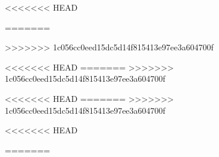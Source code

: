 \usepackage{bm}

<<<<<<< HEAD
\usepackage{graphicx}
\usepackage{amsmath,amssymb,amsthm}
\usepackage{bm}

\usepackage{xcolor}
\usepackage{colortbl}

=======
\usepackage{xcolor}
\usepackage{colortbl}
>>>>>>> 1c056cc0eed15dc5d14f815413e97ee3a604700f
\def\boldred#1{\color{red}\textbf{#1}}

\def\IC{\mathbb{C}}
\def\IF{\mathbb{F}}
\def\II{\mathbb{I}}
\def\IM{\mathbb{M}}
\def\IN{\mathbb{N}}
\def\IP{\mathbb{P}}
\def\IR{\mathbb{R}}
\def\IZ{\mathbb{Z}}

\def\ba{\mathbf{a}}
\def\bb{\mathbf{b}}
\def\bc{\mathbf{c}}
\def\be{\mathbf{e}}
<<<<<<< HEAD
=======
\def\bg{\mathbf{g}}
>>>>>>> 1c056cc0eed15dc5d14f815413e97ee3a604700f
\def\bh{\mathbf{h}}
\def\bi{\mathbf{i}}
\def\bj{\mathbf{j}}
\def\bk{\mathbf{k}}
\def\bn{\mathbf{n}}
\def\bp{\mathbf{p}}
\def\br{\mathbf{r}}
\def\bs{\mathbf{s}}
\def\bu{\mathbf{u}}
\def\bv{\mathbf{v}}
\def\bw{\mathbf{w}}
\def\bx{\mathbf{x}}
\def\by{\mathbf{y}}
\def\bz{\mathbf{z}}

\def\bB{\mathbf{B}}
\def\bD{\mathbf{D}}
\def\bF{\mathbf{F}}
\def\bG{\mathbf{G}}
\def\bN{\mathbf{N}}
\def\bR{\mathbf{R}}
\def\bS{\mathbf{S}}
\def\bT{\mathbf{T}}
\def\b0{\mathbf{0}}

\bmdefine{\bmu}{\bm{\mu}}

\def\A{\mathcal{A}}
\def\B{\mathcal{B}}
\def\C{\mathcal{C}}
\def\D{\mathcal{D}}
\def\E{\mathcal{E}}
\def\F{\mathcal{F}}
\def\G{\mathcal{G}}
\def\I{\mathcal{I}}
\def\L{\mathcal{L}}
\def\M{\mathcal{M}}
<<<<<<< HEAD
=======
\def\N{\mathcal{N}}
>>>>>>> 1c056cc0eed15dc5d14f815413e97ee3a604700f
\def\P{\mathcal{P}}
\def\R{\mathcal{R}}
\def\S{\mathcal{S}}
\def\T{\mathcal{T}}
\def\U{\mathcal{U}}
\def\V{\mathcal{V}}

\def\nbOne{{\mathchoice {\rm 1\mskip-4mu l} {\rm 1\mskip-4mu l}
{\rm 1\mskip-4.5mu l} {\rm 1\mskip-5mu l}}}

\def\cov{\ensuremath{\mathsf{cov}}}
\def\Var{\ensuremath{\mathsf{Var}\ }}
<<<<<<< HEAD

\def\defword#1{\textbf{#1}\index{#1}}



=======
\def\sgn{\ensuremath{\mathsf{sgn}}}

\newtheorem{proposition}[theorem]{Proposition}
\newtheorem{property}[theorem]{Property}
\newtheorem{importantproperty}[theorem]{Property}
\newtheorem{importanttheorem}[theorem]{Theorem}



